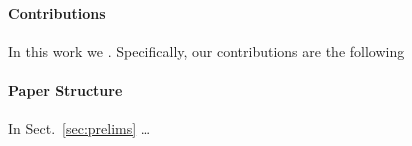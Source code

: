 \paragraph*{Contributions}
In this work we . Specifically, our
contributions are the following

\begin{itemize*}
	\item {}
\end{itemize*}

\paragraph*{Paper Structure} In Sect.~\ref{sec:prelims} \ldots
{}
